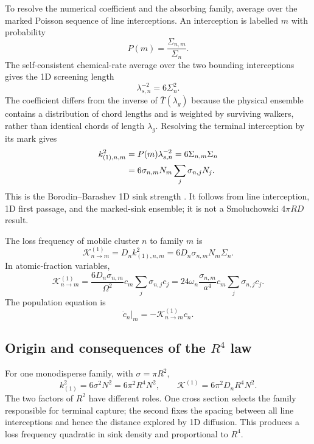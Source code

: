 \documentclass[11pt]{article}
\newcommand{\KK}{\mathcal{K}}
\begin{document}
To resolve the numerical coefficient and the absorbing family, average over
the marked Poisson sequence of line interceptions. An interception is labelled
\(m\) with probability
\begin{equation}
 P(m)=\frac{\Sigma_{n,m}}{\Sigma_n}.
\end{equation}
The self-consistent chemical-rate average over the two bounding
interceptions gives the 1D screening length
\begin{equation}
 \lambda_{s,n}^{-2}=6\Sigma_n^2.                   \label{eq:screening}
\end{equation}
The coefficient differs from the inverse of
\(\overline T(\lambda_g)\) because the physical ensemble contains a
distribution of chord lengths and is weighted by surviving walkers, rather
than identical chords of length \(\lambda_g\). Resolving the terminal
interception by its mark gives
\begin{align}
 k^2_{(1),n,m}
 &=P(m)\lambda_{s,n}^{-2}
 =6\Sigma_{n,m}\Sigma_n \notag\\
 &=6\sigma_{n,m}N_m\sum_j\sigma_{n,j}N_j.
 \label{eq:k1-family}
\end{align}
This is the Borodin--Barashev 1D sink strength
\cite{Borodin1998,Barashev2001}. It follows from line interception, 1D
first passage, and the marked-sink ensemble; it is not a Smoluchowski
\(4\pi RD\) result.

The loss frequency of mobile cluster \(n\) to family \(m\) is
\begin{equation}
 \boxed{\KK^{(1)}_{n\rightarrow m}
 =D_nk^2_{(1),n,m}
 =6D_n\sigma_{n,m}N_m\Sigma_n.}                   \label{eq:K1-Hz}
\end{equation}
In atomic-fraction variables,
\begin{equation}
 \boxed{\KK^{(1)}_{n\rightarrow m}
 =\frac{6D_n\sigma_{n,m}}{\Omega^2}
 c_m\sum_j\sigma_{n,j}c_j
 =24\omega_n\frac{\sigma_{n,m}}{a^4}
 c_m\sum_j\sigma_{n,j}c_j.}                       \label{eq:K1-af}
\end{equation}
The population equation is
\begin{equation}
 \left.\dot c_n\right|_m=-\KK^{(1)}_{n\rightarrow m}c_n.
\end{equation}

\subsection{Origin and consequences of the \(R^4\) law}
For one monodisperse family, with \(\sigma=\pi R^2\),
\begin{equation}
 k^2_{(1)}=6\sigma^2N^2=6\pi^2R^4N^2,\qquad
 \KK^{(1)}=6\pi^2D_nR^4N^2.                       \label{eq:R4}
\end{equation}
The two factors of \(R^2\) have different roles. One cross section selects
the family responsible for terminal capture; the second fixes the spacing
between all line interceptions and hence the distance explored by 1D
diffusion. This produces a loss frequency quadratic in sink density and
proportional to \(R^4\).
\end{document}
